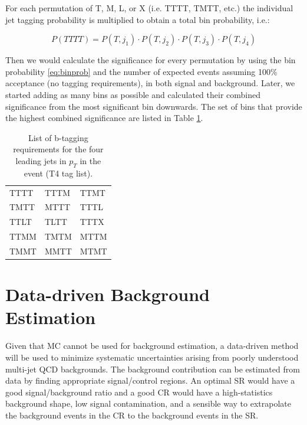 For each permutation of T, M, L, or X (i.e. TTTT, TMTT, etc.) the individual jet tagging probability is multiplied to obtain a total bin probability, i.e.:

\begin{equation}
P(TTTT) = P(T,j_{1})\cdot P(T,j_{2})\cdot P(T,j_{3})\cdot P(T,j_{4})
\label{eq:binprob}
\end{equation}

Then we would calculate the significance for every permutation by using the bin probability \ref{eq:binprob} and the number of expected events assuming 100$\%$ acceptance (no tagging requirements), in both signal and background. Later, we started adding as many bins as possible and calculated their combined significance from the most significant bin downwards. The set of bins that provide the highest combined significance are listed in Table \ref{tab:t4tag}.

\begin{table}[hbtp]\footnotesize
	\centering
	\begin{tabular}{l|l|l}
		\hline
		TTTT & TTTM & TTMT\\
		TMTT & MTTT & TTTL\\
		TTLT & TLTT & TTTX\\
		TTMM & TMTM & MTTM\\
		TMMT & MMTT & MTMT\\
		\hline
	\end{tabular}
	\caption{List of b-tagging requirements for the four leading jets in $p_{T}$ in the event (T4 tag list).}
	\label{tab:t4tag}
\end{table}


\section{Data-driven Background Estimation\label{sec:datadriven}}
Given that MC cannot be used for background estimation, a data-driven method will be used to minimize systematic uncertainties arising from poorly understood multi-jet QCD backgrounds. The background contribution can be estimated from data by finding appropriate signal/control regions. An optimal SR would have a good signal/background ratio and a good CR would have a high-statistics background shape, low signal contamination, and a sensible way to extrapolate the background events in the CR to the background events in the SR.

